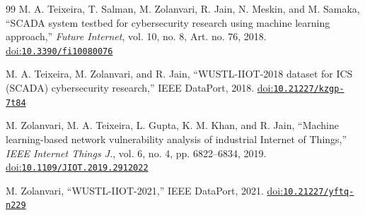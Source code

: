 \begin{thebibliography}{99}
M. A. Teixeira, T. Salman, M. Zolanvari, R. Jain, N. Meskin, and M. Samaka, ``SCADA system testbed for cybersecurity research using machine learning approach,'' \emph{Future Internet}, vol. 10, no. 8, Art. no. 76, 2018. \href{https://doi.org/10.3390/fi10080076}{doi:\nolinkurl{10.3390/fi10080076}}

M. A. Teixeira, M. Zolanvari, and R. Jain, ``WUSTL-IIOT-2018 dataset for ICS (SCADA) cybersecurity research,'' IEEE DataPort, 2018. \href{https://doi.org/10.21227/kzgp-7t84}{doi:\nolinkurl{10.21227/kzgp-7t84}}

M. Zolanvari, M. A. Teixeira, L. Gupta, K. M. Khan, and R. Jain, ``Machine learning-based network vulnerability analysis of industrial Internet of Things,'' \emph{IEEE Internet Things J.}, vol. 6, no. 4, pp. 6822--6834, 2019. \href{https://doi.org/10.1109/JIOT.2019.2912022}{doi:\nolinkurl{10.1109/JIOT.2019.2912022}}

M. Zolanvari, ``WUSTL-IIOT-2021,'' IEEE DataPort, 2021. \href{https://doi.org/10.21227/yftq-n229}{doi:\nolinkurl{10.21227/yftq-n229}}

\end{thebibliography}

